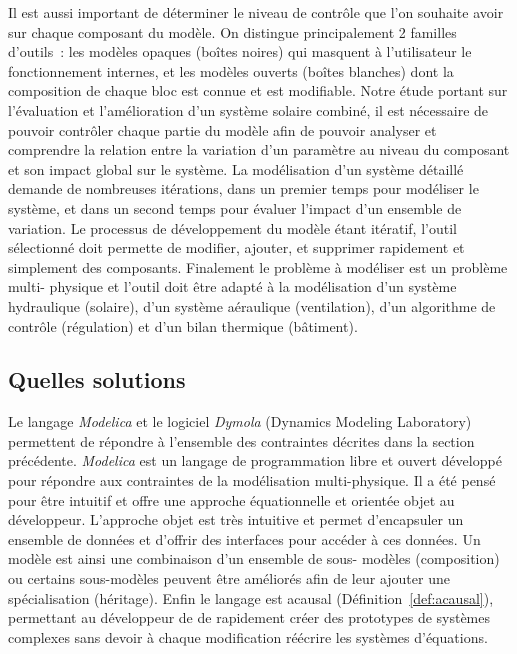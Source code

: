 Il est aussi important de déterminer le niveau de contrôle que l’on souhaite avoir sur
chaque composant du modèle. On distingue principalement 2 familles d’outils~: les modèles
opaques (boîtes noires) qui masquent à l’utilisateur le fonctionnement internes, et les
modèles ouverts (boîtes blanches) dont la composition de chaque bloc est connue et est
modifiable. Notre étude portant sur l’évaluation et l’amélioration d’un système solaire
combiné, il est nécessaire de pouvoir contrôler chaque partie du modèle afin de pouvoir
analyser et comprendre la relation entre la variation d’un paramètre au niveau du
composant et son impact global sur le système. La modélisation d’un système détaillé
demande de nombreuses itérations, dans un premier temps pour modéliser le système, et dans
un second temps pour évaluer l’impact d’un ensemble de variation. Le processus de
développement du modèle étant itératif, l’outil sélectionné doit permette de modifier,
ajouter, et supprimer rapidement et simplement des composants. Finalement le problème à
modéliser est un problème multi- physique et l’outil doit être adapté à la modélisation
d’un système hydraulique (solaire), d’un système aéraulique (ventilation), d’un algorithme
de contrôle (régulation) et d’un bilan thermique (bâtiment).



\subsection{Quelles solutions} %
\label{sub:quelles_solutions}
Le langage \textit{Modelica} et le logiciel \textit{Dymola} (Dynamics Modeling Laboratory)
permettent de répondre à l’ensemble des contraintes décrites dans la section précédente.
\textit{Modelica} est un langage de programmation libre et ouvert développé pour répondre
aux contraintes de la modélisation multi-physique. Il a été pensé pour être intuitif et
offre une approche équationnelle et orientée objet au développeur. L’approche objet est
très intuitive et permet d’encapsuler un ensemble de données et d’offrir des interfaces
pour accéder à ces données. Un modèle est ainsi une combinaison d’un ensemble de sous-
modèles (composition) ou certains sous-modèles peuvent être améliorés afin de leur ajouter
une spécialisation (héritage). Enfin le langage est acausal
(Définition~\ref{def:acausal}), permettant au développeur de de rapidement créer des
prototypes de systèmes complexes sans devoir à chaque modification réécrire les systèmes
d’équations.


